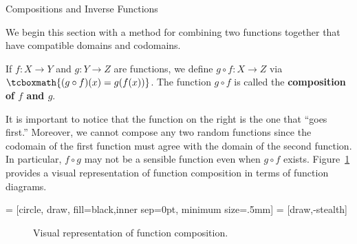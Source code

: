 \begin{section}{Compositions and Inverse Functions}\label{sec:Compositions and Inverse Functions}

We begin this section with a method for combining two functions together that have compatible domains and codomains.

\begin{definition}
If $f:X\to Y$ and $g:Y\to Z$ are functions, we define $g\circ f:X\to Z$ via $\tcboxmath{(g\circ f)(x)=g(f(x))}$. The function $g\circ f$ is called the \textbf{composition of $f$ and $g$}.
\end{definition}

It is important to notice that the function on the right is the one that ``goes first.''  Moreover, we cannot compose any two random functions since the codomain of the first function must agree with the domain of the second function.  In particular, $f\circ g$ may not be a sensible function even when $g\circ f$ exists. Figure~\ref{fig:function composition} provides a visual representation of function composition in terms of function diagrams.

 = [circle, draw, fill=black,inner sep=0pt, minimum size=.5mm]
 = [draw,-stealth]

\begin{figure}[h!]
\begin{center}
\caption{Visual representation of function composition.}\label{fig:function composition}
\end{center}
\end{figure}


\end{section}
